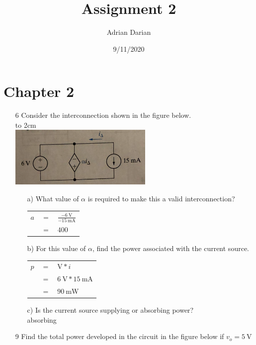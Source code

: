 \documentclass[a4paper]{article}
\title{Assignment 2}
\author{Adrian Darian}
\date{9/11/2020}
\begin{document}
  
\maketitle
  
\section*{Chapter 2}
\begin{itemize}
	\item[6] Consider the interconnection shown in the figure below. \\
	      \hbox to 2cm{} \\	  
	      \includegraphics{P2-6.png} \\ 
	      \begin{itemize}
	      	\item[a)] What value of $\alpha$ is required to make this a valid interconnection? \\
	      	      \begin{tabular}{r c l}
	      	      	$a$ & $=$ & $\frac{\SI{-6}{\volt}}{\SI{-15}{\milli\ampere}}$ \\
	      	      	    & $=$ & $400$                                            \\
	      	      \end{tabular}
	      	\item[b)] For this value of $\alpha$, find the power associated with the current source. \\
	      	      \begin{tabular}{r c l}
	      	      	$p$ & $=$ & $\si{\volt} * i$                         \\
	      	      	    & $=$ & $\SI{6}{\volt} * \SI{15}{\milli\ampere}$ \\
	      	      	    & $=$ & $\SI{90}{\milli\watt}$                   \\
	      	      \end{tabular}
	      	\item[c)] Is the current source supplying or absorbing power? \\
	      	      absorbing
	      \end{itemize} 
	\item[9] Find the total power developed in the circuit in the figure below if $v_{o} = \SI{5}{\volt}$ \\

\end{itemize}
\end{document}
